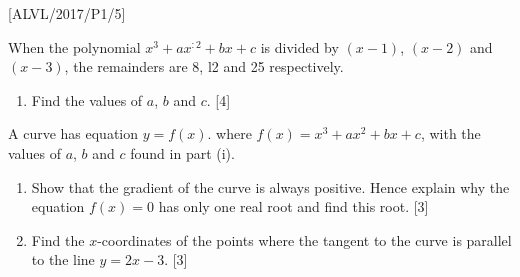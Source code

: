 \item {[}ALVL/2017/P1/5{]}

When the polynomial $x^{3}+ax^{:2}+bx+c$ is divided by $\left(x-1\right)$,
$\left(x-2\right)$ and $\left(x-3\right)$, the remainders are 8,
l2 and 25 respectively.
\begin{enumerate}
\item Find the values of $a$, $b$ and $c$. \hfill{}{[}4{]}
\end{enumerate}
A curve has equation $y=f\left(x\right)$. where $f\left(x\right)=x^{3}+ax^{2}+bx+c$,
with the values of $a$, $b$ and $c$ found in part (i).
\begin{enumerate}
\item Show that the gradient of the curve is always positive. Hence explain
why the equation $f\left(x\right)=0$ has only one real root and find
this root.\hfill{} {[}3{]}
\item Find the $x$-coordinates of the points where the tangent to the curve
is parallel to the line $y=2x-3$. \hfill{}{[}3{]}
\end{enumerate}

